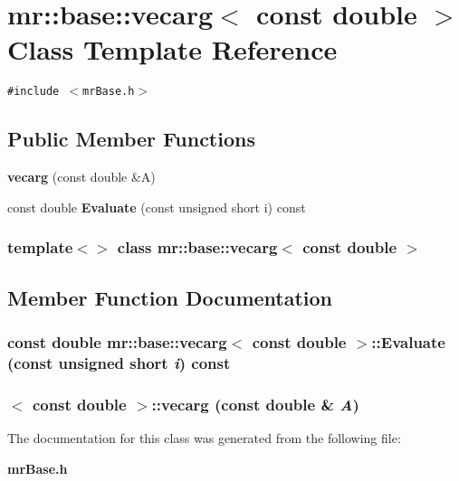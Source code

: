 \section{mr::base::vecarg$<$ const double $>$ Class Template Reference}
\label{classmr_1_1base_1_1vecarg_3_01const_01double_01_4}
{\tt \#include $<$mr\-Base.h$>$}

\subsection*{Public Member Functions}
\begin{CompactItemize}
\item 
{\bf vecarg} (const double \&A)
\item 
const double {\bf Evaluate} (const unsigned short i) const 
\end{CompactItemize}
\subsubsection*{template$<$$>$ class mr::base::vecarg$<$ const double $>$}



\subsection{Member Function Documentation}
\subsubsection{\setlength{\rightskip}{0pt plus 5cm}const double {\bf mr::base::vecarg}$<$ const double $>$::Evaluate (const unsigned short {\em i}) const\hspace{0.3cm}{\tt  [inline]}}\label{classmr_1_1base_1_1vecarg_3_01const_01double_01_4_a1}


\subsubsection{$<$ const double $>$::{\bf vecarg} (const double \& {\em A})\hspace{0.3cm}{\tt  [inline]}}\label{classmr_1_1base_1_1vecarg_3_01const_01double_01_4_a0}




The documentation for this class was generated from the following file:\begin{CompactItemize}
\item 
{\bf mr\-Base.h}\end{CompactItemize}

